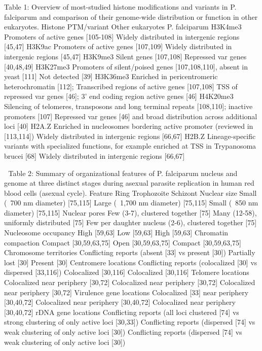 Table 1: Overview of most-studied histone modifications and variants in P.
falciparum and comparison of their genome-wide distribution or function in
other eukaryotes.
Histone PTM/variant
Other eukaryotes
P. falciparum
H3K4me3
Promoters of active genes [105-108]
Widely distributed in intergenic regions [45,47]
H3K9ac
Promoters of active genes [107,109]
Widely distributed in intergenic regions
[45,47]
H3K9me3
Silent genes [107,108]
Repressed var genes [40,48,49]
H3K27me3
Promoters of silent/poised genes [107,108,110], absent in yeast [111]
Not detected [39]
H3K36me3
Enriched in pericentromeric heterochromatin [112];
Transcribed regions of active genes [107,108]
TSS of repressed var genes [46];
3’ end coding region active genes [46]
H4K20me3
Silencing of telomeres, transposons and long terminal repeats [108,110];
inactive promoters [107]
Repressed var genes [46] and broad distribution across additional loci [40]
H2A.Z
Enriched in nucleosomes bordering active promoter (reviewed in [113,114])
Widely distributed in intergenic regions [66,67]
H2B.Z
Lineage-specific variants with specialized functions, for example enriched at
TSS in Trypanosoma brucei [68]
Widely distributed in intergenic regions [66,67]


Table 2: Summary of organizational features of P. falciparum nucleus and
genome at three distinct stages during asexual parasite replication in human
red blood cells (asexual cycle).
Feature
Ring
Trophozoite
Schizont
Nuclear size
Small (~700 nm diameter) [75,115]
Large (~1,700 nm diameter) [75,115]
Small (~850 nm diameter) [75,115]
Nuclear pores
Few (3-7), clustered together [75]
Many (12-58), uniformly distributed [75]
Few per daughter nucleus (2-6), clustered together [75]
Nucleosome occupancy
High [59,63]
Low [59,63]
High [59,63]
Chromatin compaction
Compact [30,59,63,75]
Open [30,59,63,75]
Compact [30,59,63,75]
Chromosome territories
Conflicting reports (absent [33] vs present [30])
Partially lost [30]
Present [30]
Centromere locations
Conflicting reports (colocalized [30] vs dispersed [33,116])
Colocalized [30,116]
Colocalized [30,116]
Telomere locations
Colocalized near periphery [30,72]
Colocalized near periphery [30,72]
Colocalized near periphery [30,72]
Virulence gene locations
Colocalized [33] near periphery [30,40,72]
Colocalized near periphery [30,40,72]
Colocalized near periphery [30,40,72]
rDNA gene locations
Conflicting reports (all loci clustered [74] vs strong clustering of only
active loci [30,33])
Conflicting reports (dispersed [74] vs weak clustering of only active loci
[30])
Conflicting reports (dispersed [74] vs weak clustering of only active loci
[30])
